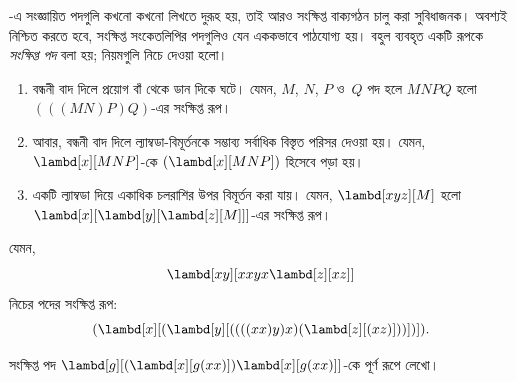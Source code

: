 \documentclass[../../../include/open-logic-section]{subfiles}
\begin{document}

-এ সংজ্ঞায়িত পদগুলি কখনো কখনো লিখতে দুরূহ হয়,
তাই আরও সংক্ষিপ্ত বাক্যগঠন চালু করা সুবিধাজনক। অবশ্যই নিশ্চিত করতে হবে,
সংক্ষিপ্ত সংকেতলিপির পদগুলিও যেন এককভাবে পাঠযোগ্য হয়। বহুল ব্যবহৃত একটি
রূপকে \emph{সংক্ষিপ্ত পদ} বলা হয়; নিয়মগুলি নিচে দেওয়া হলো।

\begin{enumerate}
\item বন্ধনী বাদ দিলে প্রয়োগ বাঁ থেকে ডান দিকে ঘটে। যেমন, $M$, $N$,
  $P$ ও~$Q$ পদ হলে $MNPQ$ হলো $(((MN)P)Q)$-এর সংক্ষিপ্ত রূপ।
\item আবার, বন্ধনী বাদ দিলে ল্যাম্বডা-বিমূর্তনকে সম্ভাব্য সর্বাধিক বিস্তৃত
  পরিসর দেওয়া হয়। যেমন, $\lambd[x][MNP]$-কে
  $(\lambd[x][MNP])$ হিসেবে পড়া হয়।
\item একটি ল্যাম্বডা দিয়ে একাধিক চলরাশির উপর বিমূর্তন করা যায়। যেমন,
  $\lambd[xyz][M]$ হলো $\lambd[x][\lambd[y][\lambd[z][M]]]$-এর সংক্ষিপ্ত
  রূপ।
\end{enumerate}

যেমন,
\[
\lambd[xy][xxyx \lambd[z][xz]]
\]
নিচের পদের সংক্ষিপ্ত রূপ:
\[
(\lambd[x][(\lambd[y][((((xx)y)x)(\lambd[z][(xz)]))])]).
\]

\begin{prob}
সংক্ষিপ্ত পদ $\lambd[g][(\lambd[x][g (x x)])
  \lambd[x][g (x x)]]$-কে পূর্ণ রূপে লেখো।
\end{prob}
\end{document}
